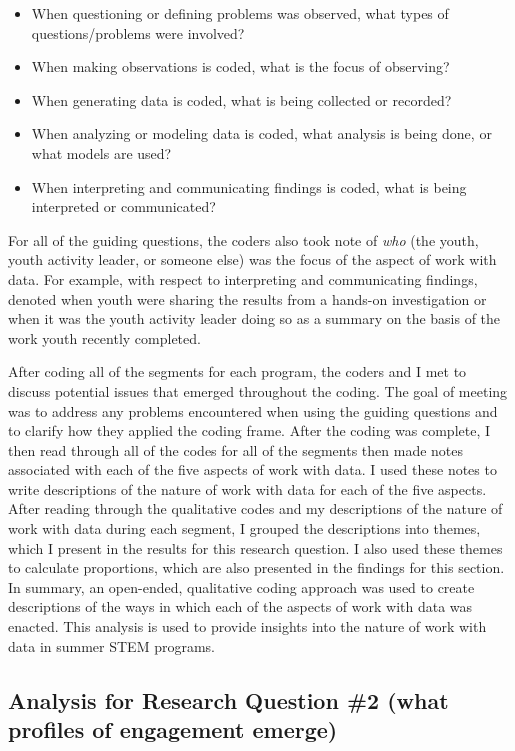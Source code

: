 \documentclass[]{msu-thesis}
\providecommand{\tightlist}{%
  \setlength{\itemsep}{0pt}\setlength{\parskip}{0pt}}
\theoremstyle{definition}
\theoremstyle{definition}
\theoremstyle{definition}
\theoremstyle{remark}
\begin{document}
\begin{itemize}
\tightlist
\item
  When questioning or defining problems was observed, what types of
  questions/problems were involved?
\item
  When making observations is coded, what is the focus of observing?
\item
  When generating data is coded, what is being collected or recorded?
\item
  When analyzing or modeling data is coded, what analysis is being done,
  or what models are used?
\item
  When interpreting and communicating findings is coded, what is being
  interpreted or communicated?
\end{itemize}

For all of the guiding questions, the coders also took note of
\emph{who} (the youth, youth activity leader, or someone else) was the
focus of the aspect of work with data. For example, with respect to
interpreting and communicating findings, denoted when youth were sharing
the results from a hands-on investigation or when it was the youth
activity leader doing so as a summary on the basis of the work youth
recently completed.

After coding all of the segments for each program, the coders and I met
to discuss potential issues that emerged throughout the coding. The goal
of meeting was to address any problems encountered when using the
guiding questions and to clarify how they applied the coding frame.
After the coding was complete, I then read through all of the codes for
all of the segments then made notes associated with each of the five
aspects of work with data. I used these notes to write descriptions of
the nature of work with data for each of the five aspects. After reading
through the qualitative codes and my descriptions of the nature of work
with data during each segment, I grouped the descriptions into themes,
which I present in the results for this research question. I also used
these themes to calculate proportions, which are also presented in the
findings for this section. In summary, an open-ended, qualitative coding
approach was used to create descriptions of the ways in which each of
the aspects of work with data was enacted. This analysis is used to
provide insights into the nature of work with data in summer STEM
programs.

\subsection{Analysis for Research Question \#2 (what profiles of
engagement
emerge)}\label{analysis-for-research-question-2-what-profiles-of-engagement-emerge}
\end{document}
